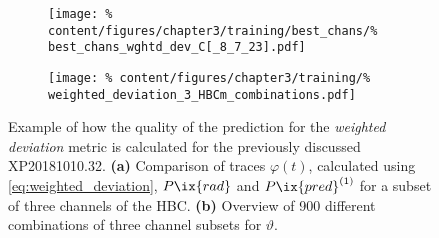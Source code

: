 %
                \begin{figure}[t]%
                    \centering%
                    \begin{subfigure}{0.47\textwidth}%
                        \texttt{[image: \%
                            content/figures/chapter3/training/best\_chans/\%
                            best\_chans\_wghtd\_dev\_C[\_8\_7\_23].pdf]}%
                        \caption{}%
                    \end{subfigure}%
                    \hfill%
                    \begin{subfigure}{0.47\textwidth}%
                        \texttt{[image: \%
                            content/figures/chapter3/training/\%
                            weighted\_deviation\_3\_HBCm\_combinations.pdf]}%
                        \caption{}%
                    \end{subfigure}%
                    \caption{Example of how the quality of the prediction for the \textit{weighted deviation} metric is calculated for the previously discussed XP20181010.32. \textbf{(a)} Comparison of traces $\varphi\left(t\right)$, calculated using \cref{eq:weighted_deviation}, $P\ix{rad}$ and $P\ix{pred}^{\left(1\right)}$ for a subset of three channels of the HBC. \textbf{(b)} Overview of 900 different combinations of three channel subsets for $\vartheta$.}\label{fig:weighted_deviation}%
                \end{figure}%
%
